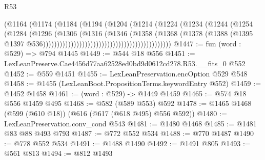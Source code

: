\begin{lexlean}{R53}
\begin{coremodule}
                                                        (@1164
                                                          (@1174
                                                            (@1184
                                                              (@1194
                                                                (@1204
                                                                  (@1214
                                                                    (@1224
                                                                      (@1234
                                                                        (@1244
                                                                          (@1254
                                                                            (@1284
                                                                              (@1296
                                                                                (@1306
                                                                                  (@1316
                                                                                    (@1346
                                                                                      (@1358
                                                                                        (@1368
                                                                                          (@1378
                                                                                            (@1388
                                                                                              (@1395
                                                                                                @1397
                                                                                                @536))))))))))))))))))))))))))))))))))))))))))))))
@1447 := fun (word : @529) => @794 @1445
@1449 := @544 @18 @556
@1451 := LexLeanPreserve.Cae4456d77aa62528ed0bd9d0612cd278.R53.__fits_0 @552
@1452 := @559 @1451
@1455 := LexLeanPreservation.encOption @529 @548
@1458 := @1455 (LexLeanBoot.PropositionTerms.keywordEntry @552)
@1459 := @1452 @1458
@1461 := (word : @529) -> @1449 @1459
@1465 := @574 @18 @556 @1459 @495
@1468 := @582 (@589 @553) @592
@1478 := @1465 @1468 (@599 (@610 @18)) (@616 (@617 (@618 @495) @556 @592))
@1480 := LexLeanPreservation.conv_cond @543
@1481 := @1480 @1468
@1485 := @1481 @83 @88 @493 @793
@1487 := @772 @552 @534
@1488 := @770 @1487
@1490 := @778 @552 @534
@1491 := @1488 @1490
@1492 := @1491 @805
@1493 := @561 @813
@1494 := @812 @1493

\end{coremodule}
\end{lexlean}
